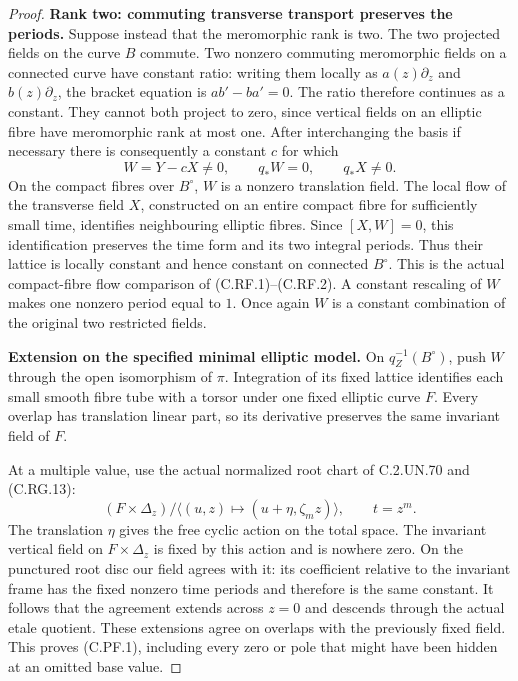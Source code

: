\begin{proof}
\par\medskip\noindent\textbf{Rank two: commuting transverse transport preserves the periods.}
Suppose instead that the meromorphic rank is two.
The two projected fields on the curve \(B\)
commute. Two nonzero commuting meromorphic fields
on a connected curve have constant ratio:
writing them locally as \(a(z)\partial_z\) and
\(b(z)\partial_z\), the bracket equation is
\(ab'-ba'=0\). The ratio therefore continues as
a constant. They cannot both project to zero,
since vertical fields on an elliptic fibre have
meromorphic rank at most one. After interchanging
the basis if necessary there is consequently a
constant \(c\) for which
\[
             W=Y-cX\ne0,\qquad q_*W=0,\qquad
                         q_*X\ne0 .
 \tag{C.PF.7}
\]
On the compact fibres over \(B^\circ\), \(W\)
is a nonzero translation field. The local flow
of the transverse field \(X\), constructed on
an entire compact fibre for sufficiently small
time, identifies neighbouring elliptic fibres.
Since \([X,W]=0\), this identification preserves
the time form and its two integral periods.
Thus their lattice is locally constant and
hence constant on connected \(B^\circ\).
This is the actual compact-fibre flow comparison
of (C.RF.1)--(C.RF.2). A constant rescaling of
\(W\) makes one nonzero period equal to \(1\).
Once again \(W\) is a constant combination of
the original two restricted fields.

\par\medskip\noindent\textbf{Extension on the specified minimal elliptic model.}
On \(q_Z^{-1}(B^\circ)\), push \(W\) through
the open isomorphism of \(\pi\). Integration of
its fixed lattice identifies each small smooth
fibre tube with a torsor under one fixed elliptic
curve \(F\). Every overlap has translation
linear part, so its derivative preserves the
same invariant field of \(F\).

At a multiple value, use the actual normalized
root chart of C.2.UN.70 and (C.RG.13):
\[
 (F\times\Delta_z)/\langle
       (u,z)\longmapsto(u+\eta,\zeta_mz)\rangle,
       \qquad t=z^m .
 \tag{C.PF.8}
\]
The translation \(\eta\) gives the free cyclic
action on the total space. The invariant
vertical field on \(F\times\Delta_z\) is fixed
by this action and is nowhere zero. On the
punctured root disc our field agrees with it:
its coefficient relative to the invariant
frame has the fixed nonzero time periods and
therefore is the same constant. It follows
that the agreement extends across \(z=0\)
and descends through the actual etale quotient.
These extensions agree on overlaps with the
previously fixed field. This proves (C.PF.1),
including every zero or pole that might have
been hidden at an omitted base value.


\end{proof}
